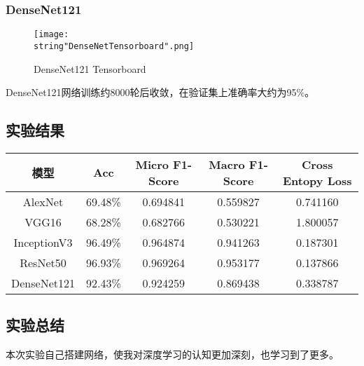 \documentclass[UTF8]{ctexart}
\begin{document}
\subsubsection{DenseNet121}

\begin{figure}[H]
    \begin{center}
        \texttt{[image: \\string"DenseNetTensorboard".png]}
    \caption{DenseNet121 Tensorboard}
    \label{fig:8}
    \end{center}
    \end{figure}
\par
DenseNet121网络训练约8000轮后收敛，在验证集上准确率大约为95\%。
\subsection{实验结果}

\begin{center}
    \begin{tabular}{||c c c c c||}
    \hline
    模型 & Acc & Micro F1-Score & Macro F1-Score & Cross Entopy Loss\\ [0.5ex]
    \hline
    AlexNet & 69.48\% &  0.694841& 0.559827&0.741160\\
    VGG16 & 68.28\% &  0.682766& 0.530221&1.800057\\
    InceptionV3 & 96.49\% & 0.964874 & 0.941263& 0.187301\\
    ResNet50 & 96.93\% & 0.969264 & 0.953177 & 0.137866\\
    DenseNet121 & 92.43\% &  0.924259 & 0.869438&0.338787\\
    \hline
   \end{tabular}
   \end{center}
\subsection{实验总结}
本次实验自己搭建网络，使我对深度学习的认知更加深刻，也学习到了更多。
\end{document}
